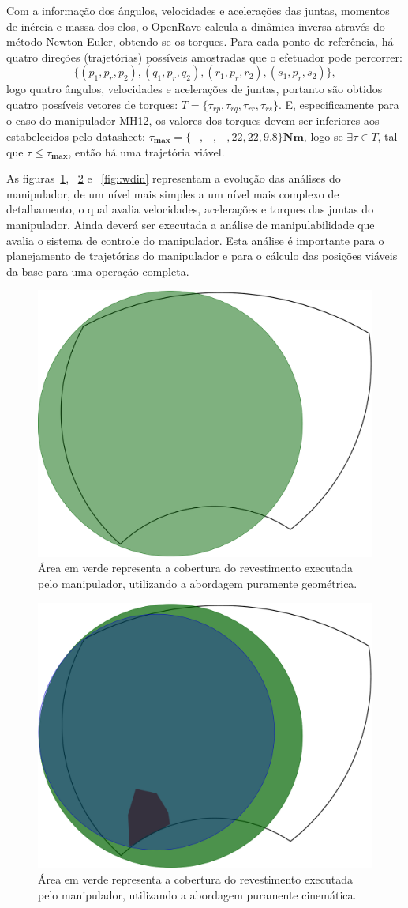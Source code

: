 Com a informação dos ângulos, velocidades e acelerações das juntas, momentos
de inércia e massa dos elos, o OpenRave calcula a dinâmica inversa através do
método Newton-Euler, obtendo-se os torques. Para cada ponto de referência, há quatro direções
(trajetórias) possíveis amostradas que o efetuador pode percorrer:
$$\{(p_1,p_r,p_2),(q_1,p_r,q_2),(r_1,p_r,r_2),(s_1,p_r,s_2)\},$$ logo quatro
ângulos, velocidades e acelerações de juntas, portanto são obtidos quatro
possíveis vetores de torques:
$T=\{\tau_{rp},\tau_{rq},\tau_{rr},\tau_{rs}\}$. E, especificamente para o
caso do manipulador MH12, os valores dos torques devem ser inferiores aos
estabelecidos pelo datasheet:
$\tau_{\textbf{max}}=\{-,-,-,22,22,9.8\}\textbf{Nm}$, logo se $\exists \tau\in
T$, tal que $\tau\leq\tau_{\textbf{max}}$, então há uma trajetória viável.

As figuras~\ref{fig::wgeo}, ~\ref{fig::wcin} e ~\ref{fig::wdin} representam a
evolução das análises do manipulador, de um nível mais simples a um nível mais
complexo de detalhamento, o qual avalia velocidades, acelerações e torques das
juntas do manipulador. Ainda deverá ser executada a análise de manipulabilidade
que avalia o sistema de controle do manipulador. Esta análise é importante para
o planejamento de trajetórias do manipulador e para o cálculo das posições
viáveis da base para uma operação completa.



\begin{figure}[h!]
	\centering	
	\includegraphics[width=0.5\columnwidth]{detail/figs/dinamica/workspaceGeometrico.png}
	\caption{Área em verde representa a cobertura do revestimento executada pelo
	manipulador, utilizando a abordagem puramente geométrica.}
	\label{fig::wgeo}
\end{figure}

\begin{figure}[h!]	
	\centering
	\includegraphics[width=0.5\columnwidth]{detail/figs/dinamica/workspaceCinematica.png}
	\caption{Área em verde representa a cobertura do revestimento executada pelo
	manipulador, utilizando a abordagem puramente cinemática.}
	\label{fig::wcin}
\end{figure}

